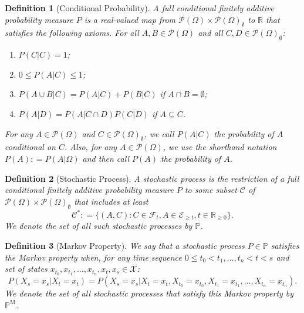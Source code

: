 \documentclass[10pt]{paper}
\newtheorem{definition}{Definition}
\newcommand{\reals}{\mathbb{R}}
\newcommand{\realsnonneg}{\reals_{\geq 0}}
\newcommand{\states}{\mathcal{X}}
\newcommand{\paths}{\Omega}
\newcommand{\power}{\mathcal{P}(\paths)}
\newcommand{\nonemptypower}{\power_{\emptyset}}
\newcommand{\events}{\mathcal{E}}
\newcommand{\filter}[1][t]{\mathcal{F}_{#1}}
\newcommand{\processes}{\mathbb{P}}
\newcommand{\mprocesses}{\processes^{\mathrm{M}}}
\newcommand{\coloneqq}{:\!=}
\begin{document}
\begin{definition}[Conditional Probability]\label{def:cond_prob}
A full conditional finitely additive probability measure $P$ is a real-valued map from $\power\times\nonemptypower$ to $\reals$ that satisfies the following axioms. For all $A,B\in\power$ and all \mbox{$C,D\in\nonemptypower$}:
\vspace{5pt}

\begin{enumerate}[label=F\arabic*:]
\item
$P(C\vert C)=1$;
\item
$0\leq P(A\vert C)\leq 1$;
\item
$P(A\cup B\vert C)=P(A\vert C)+P(B\vert C)$ if $A\cap B=\emptyset$;
\item
$P(A\vert D)=P(A\vert C\cap D)P(C\vert D)$ if $A\subseteq C$.
\end{enumerate}
\vspace{5pt}

\noindent
For any $A\in\power$ and $C\in\nonemptypower$, we call $P(A\vert C)$ the probability of $A$ conditional on $C$. Also, for any $A\in\power$, we use the shorthand notation $P(A)\coloneqq P(A\vert\paths)$ and then call $P(A)$ the probability of $A$.
\end{definition}

\begin{definition}[Stochastic Process]\label{def:stoch_process}
A \emph{stochastic process} is the restriction of a full conditional finitely additive probability measure $P$ to some subset $\mathcal{C}$ of $\power\times\nonemptypower$ that includes at least
\begin{equation*}
\mathcal{C^*}\coloneqq\big\{
(A,C)
\colon
C\in\filter, A\in\events_{\geq t}, t\in\realsnonneg
\big\}.
\end{equation*}
We denote the set of all such stochastic processes by $\processes$.
\end{definition}

\begin{definition}[Markov Property]\label{def:markov_property}
We say that a stochastic process $P\in\processes$ satisfies the \emph{Markov property} when, for any time sequence $0\leq t_0<t_1,\dots,t_{n}<t<s$ and set of states $x_{t_0},x_{t_1},\dots,x_{t_n},x_t,x_s\in\states$:
\begin{equation*}
P(X_s=x_s\vert X_t=x_t)=P(X_s=x_s\vert X_t=x_t,X_{t_0}=x_{t_0},X_{t_1}=x_{t_1}, \dots, X_{t_n}=x_{t_n}).
\end{equation*}
We denote the set of all stochastic processes that satisfy this Markov property by $\mprocesses$.
\end{definition}
\end{document}
